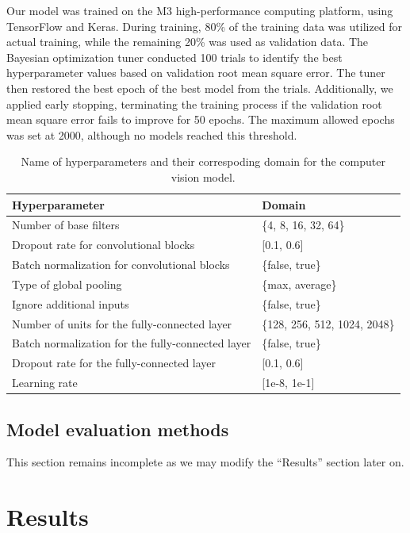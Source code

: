 \documentclass[]{interact}
\theoremstyle{plain}%
\theoremstyle{definition}
\theoremstyle{remark}
\begin{document}
Our model was trained on the M3 high-performance computing platform,
using TensorFlow and Keras. During training, 80\% of the training data
was utilized for actual training, while the remaining 20\% was used as
validation data. The Bayesian optimization tuner conducted 100 trials to
identify the best hyperparameter values based on validation root mean
square error. The tuner then restored the best epoch of the best model
from the trials. Additionally, we applied early stopping, terminating
the training process if the validation root mean square error fails to
improve for 50 epochs. The maximum allowed epochs was set at 2000,
although no models reached this threshold.

\begin{table}

\caption{\label{tab:hyperparameter}Name of hyperparameters and their correspoding domain for the computer vision model.}
\centering
\begin{tabular}[t]{ll}
\toprule
Hyperparameter & Domain\\
\midrule
Number of base filters & \{4, 8, 16, 32, 64\}\\
Dropout rate for convolutional blocks & {}[0.1, 0.6]\\
Batch normalization for convolutional blocks & \{false, true\}\\
Type of global pooling & \{max, average\}\\
Ignore additional inputs & \{false, true\}\\
\addlinespace
Number of units for the fully-connected layer & \{128, 256, 512, 1024, 2048\}\\
Batch normalization for the fully-connected layer & \{false, true\}\\
Dropout rate for the fully-connected layer & {}[0.1, 0.6]\\
Learning rate & {}[1e-8, 1e-1]\\
\bottomrule
\end{tabular}
\end{table}

\subsection{Model evaluation methods}\label{model-evaluation-methods}

This section remains incomplete as we may modify the ``Results'' section
later on.

\section{Results}\label{results}
\end{document}
